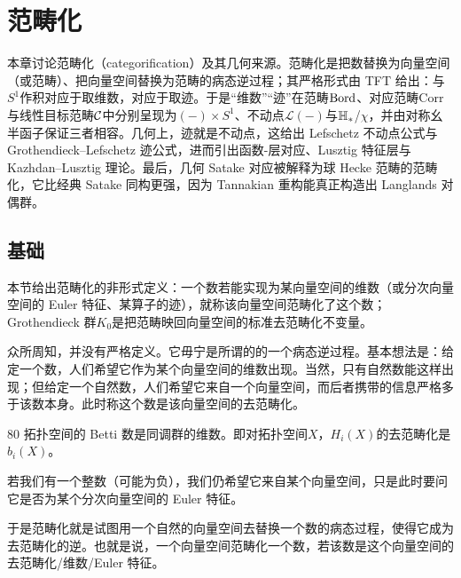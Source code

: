 \chapter{范畴化}\label{ch:12}

\begin{keytakeaways}
本章讨论范畴化（categorification）及其几何来源。范畴化是把数替换为向量空间（或范畴）、把向量空间替换为范畴的病态逆过程；其严格形式由 TFT 给出：与$S^{1}$作积对应于取维数，对应于取迹。于是“维数”“迹”在范畴$\mathrm{Bord}$、对应范畴$\mathrm{Corr}$与线性目标范畴$\mathcal{C}$中分别呈现为$(-)\times S^{1}$、不动点$\mathcal{L}(-)$与$\mathbb{H}_{*}$/$\chi$，并由对称幺半函子保证三者相容。几何上，迹就是不动点，这给出 Lefschetz 不动点公式与 Grothendieck–Lefschetz 迹公式，进而引出函数-层对应、Lusztig 特征层与 Kazhdan–Lusztig 理论。最后，几何 Satake 对应被解释为球 Hecke 范畴的范畴化，它比经典 Satake 同构更强，因为 Tannakian 重构能真正构造出 Langlands 对偶群。
\end{keytakeaways}

\section{基础}\label{sec:12-1}

\begin{sectionkey}
本节给出范畴化的非形式定义：一个数若能实现为某向量空间的维数（或分次向量空间的 Euler 特征、某算子的迹），就称该向量空间范畴化了这个数；Grothendieck 群$K_0$是把范畴映回向量空间的标准去范畴化不变量。
\end{sectionkey}

众所周知，并没有严格定义。它毋宁是所谓的的一个病态逆过程。基本想法是：给定一个数，人们希望它作为某个向量空间的维数出现。当然，只有自然数能这样出现；但给定一个自然数，人们希望它来自一个向量空间，而后者携带的信息严格多于该数本身。此时称这个数是该向量空间的去范畴化。

\begin{srcex}{80}
拓扑空间的 Betti 数是同调群的维数。即对拓扑空间$X$，$H_i(X)$的去范畴化是$b_i(X)$。
\end{srcex}

若我们有一个整数（可能为负），我们仍希望它来自某个向量空间，只是此时要问它是否为某个分次向量空间的 Euler 特征。

于是范畴化就是试图用一个自然的向量空间去替换一个数的病态过程，使得它成为去范畴化的逆。也就是说，一个向量空间范畴化一个数，若该数是这个向量空间的去范畴化/维数/Euler 特征。

